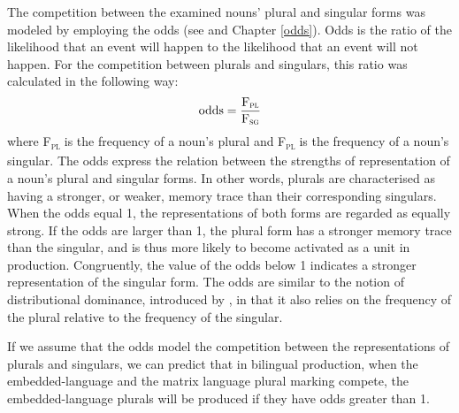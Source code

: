 The competition between the examined nouns’ plural and singular forms was modeled by employing the odds (see \citealt[119]{fahrmeir-etal-2007} and Chapter \ref{odds}). Odds is the ratio of the likelihood that an event will happen to the likelihood that an event will not happen. For the competition between plurals and singulars, this ratio was calculated in the following way: \[ \text{odds} = \frac{\text{F\textsubscript{\textsc{pl}}}}{\text{F\textsubscript{\textsc{sg}}}}\]
where F\textsubscript{\textsc{pl}} is the frequency of a noun’s plural and F\textsubscript{\textsc{pl}} is the frequency of a noun’s singular. The odds express the relation between the strengths of representation of a noun’s plural and singular forms. In other words, plurals are characterised as having a stronger, or weaker, memory trace than their corresponding singulars. When the odds equal 1, the representations of both forms are regarded as equally strong. If the odds are larger than 1, the plural form has a stronger memory trace than the singular, and is thus more likely to become activated as a unit in production. Congruently, the value of the odds below 1 indicates a stronger representation of the singular form. The odds are similar to the notion of distributional dominance, introduced by  \citep{baayen-dijkstra-schreuder}, in that it also relies on the frequency of the plural relative to the frequency of the singular.

If we assume that the odds model the competition between the representations of plurals and singulars, we can predict that in bilingual production, when the embedded-language and the matrix language plural marking compete, the embedded-language plurals will be produced if they have odds greater than 1.

